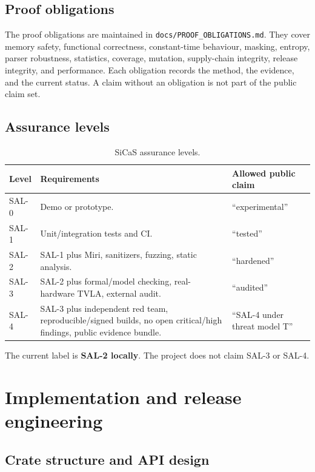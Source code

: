 \documentclass[11pt,a4paper]{article}
\newcommand{\code}[1]{\texttt{#1}}
\theoremstyle{plain}
\theoremstyle{definition}
\theoremstyle{remark}
\begin{document}
\subsection{Proof obligations}

The proof obligations are maintained in \code{docs/PROOF\_OBLIGATIONS.md}. They cover
memory safety, functional correctness, constant-time behaviour, masking, entropy,
parser robustness, statistics, coverage, mutation, supply-chain integrity, release
integrity, and performance. Each obligation records the method, the evidence, and the
current status. A claim without an obligation is not part of the public claim set.

\subsection{Assurance levels}

\begin{table}[htbp]
\centering
\caption{SiCaS assurance levels.}
\label{tab:sal}
\begin{tabularx}{\linewidth}{@{}lXl@{}}
\toprule
Level & Requirements & Allowed public claim \\
\midrule
SAL-0 & Demo or prototype. & ``experimental'' \\
SAL-1 & Unit/integration tests and CI. & ``tested'' \\
SAL-2 & SAL-1 plus Miri, sanitizers, fuzzing, static analysis. & ``hardened'' \\
SAL-3 & SAL-2 plus formal/model checking, real-hardware TVLA, external audit. & ``audited'' \\
SAL-4 & SAL-3 plus independent red team, reproducible/signed builds, no open
critical/high findings, public evidence bundle. & ``SAL-4 under threat model T'' \\
\bottomrule
\end{tabularx}
\end{table}

The current label is \textbf{SAL-2 locally}. The project does not claim SAL-3 or SAL-4.

\section{Implementation and release engineering}\label{sec:implementation}

\subsection{Crate structure and API design}
\end{document}
